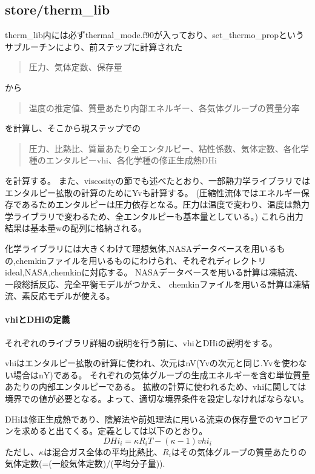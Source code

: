 \documentclass{jsarticle}
\begin{document}
\subsection{store/therm\_lib}%
therm\_lib内には必ずthermal\_mode.f90が入っており、set\_thermo\_propというサブルーチンにより、前ステップに計算された
\begin{quotation}
圧力、気体定数、保存量
\end{quotation}
から
\begin{quotation}
温度の推定値、質量あたり内部エネルギー、各気体グループの質量分率
\end{quotation}
を計算し、そこから現ステップでの
\begin{quotation}
圧力、比熱比、質量あたり全エンタルピー、粘性係数、気体定数、各化学種のエンタルピーvhi、各化学種の修正生成熱DHi
\end{quotation}
を計算する。
また、viscosityの節でも述べたとおり、一部熱力学ライブラリではエンタルピー拡散の計算のためにYvも計算する。
(圧縮性流体ではエネルギー保存であるためエンタルピーは圧力依存となる。圧力は温度で変わり、温度は熱力学ライブラリで変わるため、全エンタルピーも基本量としている。)
これら出力結果は基本量wの配列に格納される。

化学ライブラリには大きくわけて理想気体,NASAデータベースを用いるもの,chemkinファイルを用いるものにわけられ、それぞれディレクトリideal,NASA,chemkinに対応する。
NASAデータベースを用いる計算は凍結流、一段総括反応、完全平衡モデルがつかえ、
chemkinファイルを用いる計算は凍結流、素反応モデルが使える。

\paragraph{vhiとDHiの定義}%
それぞれのライブラリ詳細の説明を行う前に、vhiとDHiの説明をする。

vhiはエンタルピー拡散の計算に使われ、次元はnV(Yvの次元と同じ.Yvを使わない場合はnY)である。
それぞれの気体グループの生成エネルギーを含む単位質量あたりの内部エンタルピーである。
拡散の計算に使われるため、vhiに関しては境界での値が必要となる。よって、適切な境界条件を設定しなければならない。

DHiは修正生成熱であり、陰解法や前処理法に用いる流束の保存量でのヤコビアンを求めると出てくる。定義としては以下のとおり。
\begin{equation}
DHi_i=\kappa R_i T-(\kappa-1)vhi_i
\end{equation}
ただし、$\kappa$は混合ガス全体の平均比熱比、$R_i$はその気体グループの質量あたりの気体定数(=(一般気体定数)/(平均分子量)).
\end{document}
